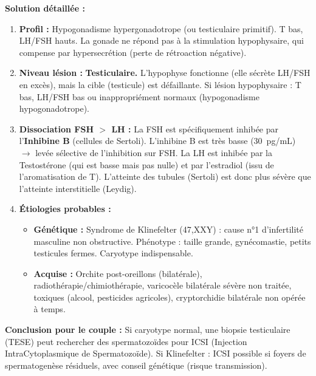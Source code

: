 \documentclass[11pt]{article}
\newcommand{\cle}[1]{{\popxbold\color{popdark}#1}}
\begin{document}
\begin{exoresolu}
\tcblower
\textbf{Solution détaillée :}
\begin{enumerate}
    \item \textbf{Profil :} \cle{Hypogonadisme hypergonadotrope} (ou testiculaire primitif). T bas, LH/FSH hauts. La gonade ne répond pas à la stimulation hypophysaire, qui compense par hypersecrétion (perte de rétroaction négative).
    \item \textbf{Niveau lésion :} \textbf{Testiculaire.} L'hypophyse fonctionne (elle sécrète LH/FSH en excès), mais la cible (testicule) est défaillante. Si lésion hypophysaire : T bas, LH/FSH bas ou inappropriément normaux (hypogonadisme hypogonadotrope).
    \item \textbf{Dissociation FSH $>$ LH :} La FSH est spécifiquement inhibée par l'\textbf{Inhibine B} (cellules de Sertoli). L'inhibine B est très basse (\SI{30}{pg/mL}) $\rightarrow$ levée sélective de l'inhibition sur FSH. La LH est inhibée par la Testostérone (qui est basse mais pas nulle) et par l'estradiol (issu de l'aromatisation de T). L'atteinte des tubules (Sertoli) est donc plus sévère que l'atteinte interstitielle (Leydig).
    \item \textbf{Étiologies probables :}
        \begin{itemize}
            \item \textbf{Génétique :} Syndrome de Klinefelter (47,XXY) : cause n°1 d'infertilité masculine non obstructive. Phénotype : taille grande, gynécomastie, petits testicules fermes. Caryotype indispensable.
            \item \textbf{Acquise :} Orchite post-oreillons (bilatérale), radiothérapie/chimiothérapie, varicocèle bilatérale sévère non traitée, toxiques (alcool, pesticides agricoles), cryptorchidie bilatérale non opérée à temps.
        \end{itemize}
\end{enumerate}
\textbf{Conclusion pour le couple :} Si caryotype normal, une biopsie testiculaire (TESE) peut rechercher des spermatozoïdes pour ICSI (Injection IntraCytoplasmique de Spermatozoïde). Si Klinefelter : ICSI possible si foyers de spermatogenèse résiduels, avec conseil génétique (risque transmission).
\end{exoresolu}
\end{document}

